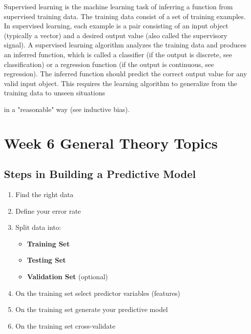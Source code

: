 \documentclass[]{report}
\begin{document}
Supervised learning is the machine learning task of inferring a function from supervised training data. The training data consist of a set of training examples. In supervised learning, each example is a pair consisting of an input object (typically a vector) and a desired output value (also called the supervisory signal). A supervised learning algorithm analyzes the training data and produces an inferred function, which is called a classifier (if the output is discrete, see classification) or a regression function (if the output is continuous, see regression). The inferred function should predict the correct output value for any valid input object. This requires the learning algorithm to generalize from the training data to unseen situations 

in a "reasonable" way (see inductive bias). 





\newpage
\section{Week 6 General Theory Topics}


\subsection{Steps in Building a Predictive Model}
\begin{enumerate}
\item Find the right data
\item Define your error rate
\item Split data into:
\begin{itemize}
\item \textbf{Training Set}
\item \textbf{Testing Set}
\item \textbf{Validation Set} (optional)
\end{itemize}
\item On the training set select predictor variables (features)
\item On the training set generate your predictive model
\item On the training set cross-validate

\end{enumerate}
\end{document}
